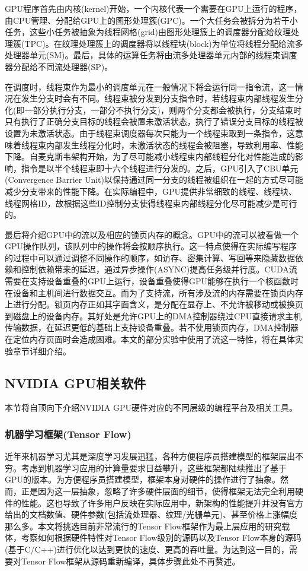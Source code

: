 \par GPU程序首先由内核(kernel)开始，一个内核代表一个需要在GPU上运行的程序，由CPU管理、分配给GPU上的图形处理簇(GPC)。一个大任务会被拆分为若干小任务，这些小任务被抽象为线程网格(grid)由图形处理簇上的调度器分配给纹理处理簇(TPC)。在纹理处理簇上的调度器将以线程块(block)为单位将线程分配给流多处理器单元(SM)。最后，具体的运算任务将由流多处理器单元内部的线程束调度器分配给不同流处理器(SP)。
\par 在调度时，线程束作为最小的调度单元在一般情况下将会运行同一指令流，这一情况在发生分支时会有不同。线程束被分发到分支指令时，若线程束内部线程发生分化(即一部分执行分支，一部分不执行分支)，则两个分支都会被执行，分支结束时只有执行了正确分支目标的线程会被置未激活状态，执行了错误分支目标的线程被设置为未激活状态。由于线程束调度器每次只能为一个线程束取到一条指令，这意味着线程束内部发生线程分化时，未激活状态的线程会被阻塞，导致利用率、性能下降。自麦克斯韦架构开始，为了尽可能减小线程束内部线程分化对性能造成的影响，指令是以半个线程束即十六个线程进行分发的。之后，GPU引入了CBU单元(Convergence Barrier Unit)以保持通过同一分支的线程被组织在一起的方式尽可能减少分支带来的性能下降\cite{THREADS}。在实际编程中，GPU提供非常细致的线程、线程块、线程网格ID，故根据这些ID控制分支使得线程束内部线程分化尽可能减少是可行的\cite{DIVER}。
\par 最后将介绍GPU中的流以及相应的锁页内存的概念。GPU中的流可以被看做一个GPU操作队列，该队列中的操作将会按顺序执行。这一特点使得在实际编写程序的过程中可以通过调整不同操作的顺序，如访存、密集计算、写回等来隐藏数据依赖和控制依赖带来的延迟\cite{STREAM}，通过异步操作(ASYNC)提高任务级并行度。CUDA流需要在支持设备重叠的GPU上运行，设备重叠使得GPU能够在执行一个核函数时在设备和主机间进行数据交互。而为了支持流，所有涉及流的内存需要在锁页内存上进行分配。锁页内存正如其字面含义，是分配在显存上、不允许被移动或被换页到磁盘上的设备内存。其好处是允许GPU上的DMA控制器绕过CPU直接请求主机传输数据，在延迟更低的基础上支持设备重叠\cite{PAGELOCK}。若不使用锁页内存，DMA控制器在定位内存页面时会造成困难。本文的部分实验中使用了流这一特性，将在具体实验章节详细介绍。

\subsection{NVIDIA GPU相关软件}
\par 本节将自顶向下介绍NVIDIA GPU硬件对应的不同层级的编程平台及相关工具。
\subsubsection{机器学习框架(Tensor Flow)}
\par 近年来机器学习尤其是深度学习发展迅猛，各种方便程序员搭建模型的框架层出不穷。考虑到机器学习应用的计算量要求日益攀升，这些框架都陆续推出了基于GPU的版本。为方便程序员搭建模型，框架本身对硬件的操作进行了抽象。然而，正是因为这一层抽象，忽略了许多硬件层面的细节，使得框架无法完全利用硬件的性能。这也导致了许多用户反映在实际应用中，新架构的性能提升并没有官方给出的文档数值、硬件参数(包括流处理器、纹理/光栅单元)、甚至价格上涨幅度那么多。本文将挑选目前非常流行的Tensor Flow框架作为最上层应用的研究载体，考察如何根据硬件特性对Tensor Flow级别的源码以及Tensor Flow本身的源码(基于C/C++)进行优化以达到更快的速度、更高的吞吐量。为达到这一目的，需要对Tensor Flow框架从源码重新编译，具体步骤此处不再赘述\cite{TFBUILD}。
